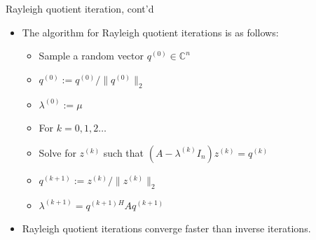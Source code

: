 \documentclass[t,usepdftitle=false]{beamer}
\begin{document}
\begin{frame}{Rayleigh quotient iteration, cont'd}
\begin{itemize}
\item The algorithm for Rayleigh quotient iterations is as follows:\vspace{.1cm}
\begin{itemize}
\item[1.] Sample a random vector $q^{(0)}\in\mathbb{C}^n$\vspace{.07cm}
\item[2.]$q^{(0)}:=q^{(0)}/\|q^{(0)}\|_2$\vspace{.07cm}
\item[3.] $\lambda^{(0)}:=\mu$\vspace{.07cm}
\item[4.]For $k=0,1,2\dots$\vspace{.07cm}
\item[5.]\hspace{.4cm}Solve for $z^{(k)}$ such that $(A-\lambda^{(k)} I_n)z^{(k)}=q^{(k)}$\vspace{.07cm}
\item[6.]\hspace{.4cm}$q^{(k+1)}:=z^{(k)}/\|z^{(k)}\|_2$\vspace{.07cm}
\item[7.]\hspace{.4cm}$\lambda^{(k+1)}=q^{(k+1)}{}^HAq^{(k+1)}$\vspace{.2cm}
\end{itemize}
\item Rayleigh quotient iterations converge faster than inverse iterations.

\end{itemize}
\end{frame}
\end{document}
